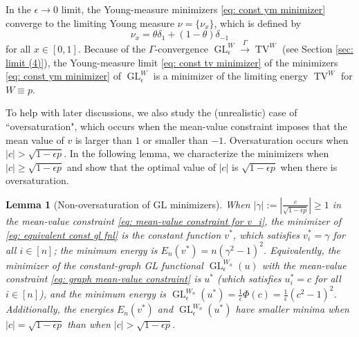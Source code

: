 \documentclass[11pt]{amsart}
\newtheorem{lemma}{Lemma}[section]
\def\ep{\epsilon}
\def\ra{\rightarrow}
\def\gamra{\stackrel{\Gamma}{\longrightarrow}}
\def\GL{\operatorname{GL}}
\def\TV{\operatorname{TV}}
\numberwithin{equation}{section}
\begin{document}
In the $\ep \ra 0$ limit, the Young-measure minimizers \eqref{eq: const ym minimizer} converge to the limiting Young measure $\nu = \{\nu_x\}$, which is defined by
\begin{equation}\label{eq: const tv minimizer}
    \nu_x = \theta \delta_1 + (1 - \theta) \delta_{-1}
\end{equation}
for all $x \in [0,1]$. Because of the $\Gamma$-convergence $\GL^W_\ep \gamra \TV^W$ (see Section \ref{sec: limit (4)}), the Young-measure limit \eqref{eq: const tv minimizer} of the minimizers \eqref{eq: const ym minimizer} of $\GL^W_\ep$ is a minimizer of the limiting energy $\TV^W$ for $W \equiv p$. 

To help with later discussions, we also study the (unrealistic) case of ``oversaturation", which occurs when the {mean-value constraint} imposes that the mean value of $v$ is larger than $1$ or smaller than $-1$. Oversaturation occurs when $|c| > {\sqrt{1 - \ep p}}$. In the following lemma, we characterize the minimizers when $|c| \geq {\sqrt{1 - \ep p}}$ and show that the optimal value of $|c|$ is $\sqrt{1 - \ep p}$ when there is oversaturation. 


\begin{lemma}[{Non-oversaturation of} GL minimizers]\label{lem: oversaturation const case}
When $|\gamma| := \left|\frac{c}{\sqrt{1 - \ep p}}\right| \geq 1$ in the {mean-value constraint} \eqref{eq: mean-value constraint for v_i}, the minimizer of \eqref{eq: equivalent const gl fnl} is the constant function $v^*$, which satisfies $v^*_i = \gamma$ for all $i \in [n]$; the minimum energy is $E_n(v^*) = n(\gamma^2 - 1)^2$. Equivalently, the minimizer of {the constant-graph GL functional} $\GL^{W_n}_\ep (u)$ with the {mean-value constraint} \eqref{eq: graph mean-value constraint} is $u^*$ (which satisfies $u_i^* = c$ for all $i \in [n]$), and the minimum energy is $\GL^{W_n}_\ep (u^*) = \frac{1}{\epsilon}\Phi(c) = \frac{1}{\epsilon}(c^2 - 1)^2$. Additionally, the energies $E_n(v^*)$ and $\GL^{W_n}_\ep (u^*)$ have smaller minima when $|c| = \sqrt{1-\ep p}$ than when $|c| > \sqrt{1 - \ep p}$.
\end{lemma}
\end{document}
